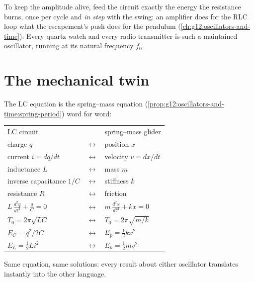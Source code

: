 \begin{remark}\label{rem:g12:rlc-oscillations:maintain}
To keep the amplitude alive, feed the circuit exactly the energy the
resistance burns, once per cycle and \emph{in step} with the swing: an
amplifier does for the RLC loop what the escapement's push does for
the pendulum (\cref{ch:g12:oscillators-and-time}). Every quartz watch
and every radio transmitter is such a maintained oscillator, running
at its natural frequency $f_0$.
\end{remark}

\section{The mechanical twin}

\begin{proposition}\label{prop:g12:rlc-oscillations:analogy}
The LC equation is the spring--mass equation
(\cref{prop:g12:oscillators-and-time:spring-period}) word for word:
\begin{center}\small
\begin{tabular}{lcl}
LC circuit & & spring--mass glider\\[2pt]
charge $q$ & $\longleftrightarrow$ & position $x$\\
current $i = dq/dt$ & $\longleftrightarrow$ & velocity $v = dx/dt$\\
inductance $L$ & $\longleftrightarrow$ & mass $m$\\
inverse capacitance $1/C$ & $\longleftrightarrow$ & stiffness $k$\\
resistance $R$ & $\longleftrightarrow$ & friction\\
$L\,\frac{d^2q}{dt^2} + \frac{q}{C} = 0$ & $\longleftrightarrow$ &
  $m\,\frac{d^2x}{dt^2} + kx = 0$\\[2pt]
$T_0 = 2\pi\sqrt{LC}$ & $\longleftrightarrow$ &
  $T_0 = 2\pi\sqrt{m/k}$\\[2pt]
$E_C = q^2/2C$ & $\longleftrightarrow$ & $E_p = \tfrac12 kx^2$\\
$E_L = \tfrac12 Li^2$ & $\longleftrightarrow$ & $E_k = \tfrac12 mv^2$
\end{tabular}
\end{center}
Same equation, same solutions: every result about either oscillator
translates instantly into the other language.
\end{proposition}

